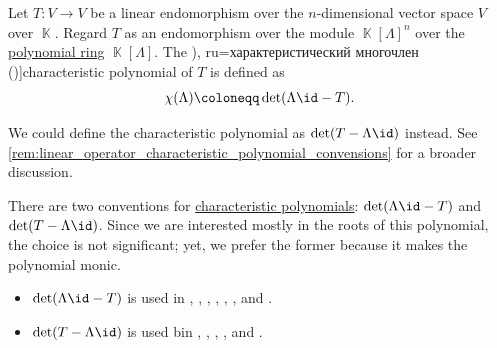 \begin{definition}\label{def:linear_operator_characteristic_polynomial}
  Let \( T: V \to V \) be a linear endomorphism over the \( n \)-dimensional vector space \( V \) over \( \BbbK \). Regard \( T \) as an endomorphism over the module \( \BbbK[\Lambda]^n \) over the \hyperref[def:polynomial_algebra]{polynomial ring} \( \BbbK[\Lambda] \). The \term[bg=характеристичен полином (\cite[77]{Обрешков1962ВисшаАлгебра}), ru=характеристический многочлен (\cite[def. 6.2.2]{Винберг2014КурсАлгебры})]{characteristic polynomial} of \( T \) is defined as
  \begin{equation*}
    \chi(\Lambda) \coloneqq \det(\Lambda \id - T).
  \end{equation*}
\end{definition}
\begin{comments}
  \item We could define the characteristic polynomial as \( \det(T - \Lambda \id) \) instead. See \cref{rem:linear_operator_characteristic_polynomial_convensions} for a broader discussion.
\end{comments}

\begin{remark}\label{rem:linear_operator_characteristic_polynomial_convensions}
  There are two conventions for \hyperref[def:linear_operator_characteristic_polynomial]{characteristic polynomials}: \( \det(\Lambda \id - T) \) and \( \det(T - \Lambda \id) \). Since we are interested mostly in the roots of this polynomial, the choice is not significant; yet, we prefer the former because it makes the polynomial monic.

  \begin{itemize}
    \item \( \det(\Lambda \id - T) \) is used in
    \cite[74]{Knapp2016BasicAlgebra},
    \cite[def. VI.6.8]{Aluffi2009Algebra},
    \cite[196]{Jacobson1985BasicAlgebraI},
    \cite[561]{Lang2002Algebra},
    \cite[390]{Rotman2015AdvancedModernAlgebraPart1},
    \cite[499]{Knuth1997ArtVol1},
    \cite[def. 6.2.2]{Винберг2014КурсАлгебры} and
    \cite[77]{Обрешков1962ВисшаАлгебра}.

    \item \( \det(T - \Lambda \id) \) is used bin
    \cite[101]{Halmos1974VectorSpaces},
    \cite[248]{FriedbergInselSpence2018LinearAlgebra},
    \cite[\S 29.4]{Тыртышников2007ЛинейнаяАлгебра},
    \cite[207]{Курош1968КурсВысшейАлгебры},
    \cite[78]{Кострикин2020АлгебраЧасть2} and
    \cite[255]{ГеновМиховскиМоллов1991Алгебра}.
  \end{itemize}
\end{remark}

